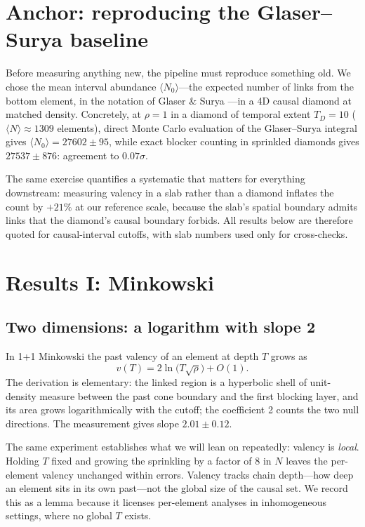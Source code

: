 \documentclass[11pt,a4paper]{article}
\begin{document}
\section{Anchor: reproducing the Glaser--Surya baseline}
\label{sec:anchor}

Before measuring anything new, the pipeline must reproduce something old. We
chose the mean interval abundance $\langle N_{0}\rangle$---the expected number
of links from the bottom element, in the notation of Glaser \& Surya
\cite{GlaserSurya2013}---in a 4D causal diamond at matched density.
Concretely, at $\rho = 1$ in a diamond of temporal extent $T_{D} = 10$
($\langle N\rangle \approx 1309$ elements), direct Monte Carlo evaluation of
the Glaser--Surya integral gives $\langle N_{0}\rangle = 27602 \pm 95$, while
exact blocker counting in sprinkled diamonds gives $27537 \pm 876$: agreement
to $0.07\sigma$.

The same exercise quantifies a systematic that matters for everything
downstream: measuring valency in a slab rather than a diamond inflates the
count by $+21\%$ at our reference scale, because the slab's spatial boundary
admits links that the diamond's causal boundary forbids. All results below are
therefore quoted for causal-interval cutoffs, with slab numbers used only for
cross-checks.

\section{Results I: Minkowski}
\label{sec:minkowski}

\subsection{Two dimensions: a logarithm with slope 2}

In 1+1 Minkowski the past valency of an element at depth $T$ grows as
\begin{equation}
  v(T) = 2\ln\!\big(T\sqrt{\rho}\big) + O(1).
\end{equation}
The derivation is elementary: the linked region is a hyperbolic shell of
unit-density measure between the past cone boundary and the first blocking
layer, and its area grows logarithmically with the cutoff; the coefficient 2
counts the two null directions. The measurement gives slope $2.01 \pm 0.12$.

The same experiment establishes what we will lean on repeatedly: valency is
\emph{local}. Holding $T$ fixed and growing the sprinkling by a factor of 8 in
$N$ leaves the per-element valency unchanged within errors. Valency tracks
chain depth---how deep an element sits in its own past---not the global size
of the causal set. We record this as a lemma because it licenses per-element
analyses in inhomogeneous settings, where no global $T$ exists.
\end{document}
